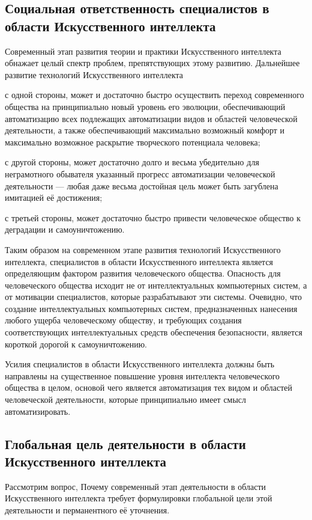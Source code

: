 \subsection*{Социальная ответственность специалистов в области Искусственного интеллекта}
Современный этап развития теории и практики Искусственного интеллекта обнажает целый спектр проблем, препятствующих этому развитию. Дальнейшее развитие технологий Искусственного интеллекта
\begin{textitemize}
	\item с одной стороны, может и достаточно быстро осуществить переход современного общества на принципиально новый уровень его эволюции, обеспечивающий  автоматизацию всех подлежащих автоматизации видов и областей человеческой деятельности, а также обеспечивающий максимально возможный комфорт и максимально возможное раскрытие творческого потенциала  человека;
	\item с другой стороны, может достаточно долго и весьма убедительно для неграмотного обывателя  указанный прогресс автоматизации человеческой деятельности --- любая даже весьма достойная цель может быть загублена имитацией её достижения;
	\item с третьей стороны, может достаточно быстро привести человеческое общество к деградации и самоуничтожению.
\end{textitemize}

Таким образом на современном этапе развития технологий Искусственного интеллекта,   специалистов в области Искусственного интеллекта является определяющим фактором развития человеческого общества.
Опасность для человеческого общества исходит не от интеллектуальных компьютерных систем, а от мотивации специалистов, которые разрабатывают эти системы. Очевидно, что создание интеллектуальных компьютерных систем, предназначенных  нанесения любого ущерба человеческому обществу, и требующих создания соответствующих интеллектуальных средств обеспечения безопасности, является короткой дорогой к самоуничтожению.

Усилия специалистов в области Искусственного интеллекта должны быть направлены на существенное повышение уровня интеллекта человеческого общества в целом, основой чего является  автоматизация  тех видом и областей человеческой деятельности, которые принципиально имеет смысл автоматизировать.

\subsection*{Глобальная цель деятельности в области Искусственного интеллекта}
Рассмотрим вопрос, Почему современный этап деятельности в области Искусственного интеллекта требует формулировки глобальной цели этой деятельности и перманентного её уточнения.


